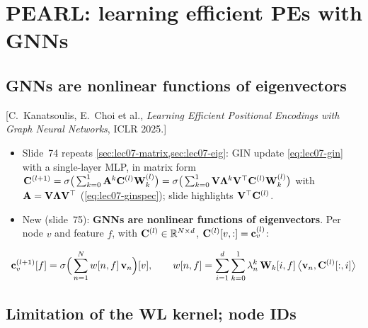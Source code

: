 \section{PEARL: learning efficient PEs with GNNs}\label{sec:lec08-pearl}

\subsection{GNNs are nonlinear functions of eigenvectors}\label{sec:lec08-gnneig}

[C.\ Kanatsoulis, E.\ Choi et al., \emph{Learning Efficient Positional Encodings
with Graph Neural Networks}, ICLR 2025.]
\begin{itemize}
  \item Slide~74 repeats \cref{sec:lec07-matrix,sec:lec07-eig}: GIN update
    \cref{eq:lec07-gin} with a single-layer MLP, in matrix form
    $\mathbf{C}^{(l+1)}=\sigma\big(\sum_{k=0}^{1}\mathbf{A}^k\mathbf{C}^{(l)}\mathbf{W}_k^{(l)}\big)
    =\sigma\big(\sum_{k=0}^{1}\mathbf{V}\bm{\Lambda}^k\mathbf{V}^{\top}\mathbf{C}^{(l)}\mathbf{W}_k^{(l)}\big)$
    with $\mathbf{A}=\mathbf{V}\bm{\Lambda}\mathbf{V}^{\top}$ (\cref{eq:lec07-ginspec}); slide
    highlights $\mathbf{V}^{\top}\mathbf{C}^{(l)}$.
  \item New (slide~75): \textbf{GNNs are nonlinear functions of eigenvectors}.
    Per node $v$ and feature $f$, with $\mathbf{C}^{(l)}\in\mathbb{R}^{N\times d}$,
    $\mathbf{C}^{(l)}[v,:]=\mathbf{c}_v^{(l)}$:
\end{itemize}
\begin{equation}\label{eq:lec08-ginfeat}
  \mathbf{c}_v^{(l+1)}[f] = \sigma\Big(\sum_{n=1}^{N} w[n,f]\,\mathbf{v}_n\Big)[v],
  \qquad
  w[n,f] = \sum_{i=1}^{d}\sum_{k=0}^{1}\lambda_n^k\,\mathbf{W}_k[i,f]\,
    \big\langle\mathbf{v}_n,\mathbf{C}^{(l)}[:,i]\big\rangle
\end{equation}

\subsection{Limitation of the WL kernel; node IDs}\label{sec:lec08-wl}

